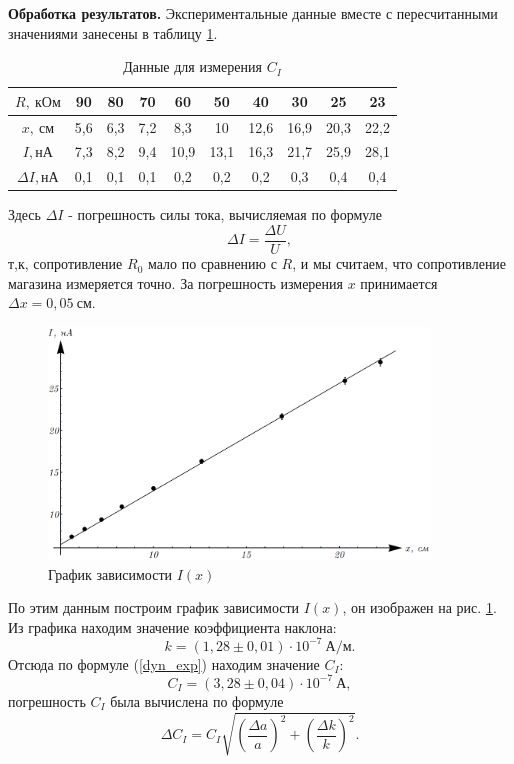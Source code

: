 \documentclass[12pt,a4paper]{article}
\begin{document}
\textbf{Обработка результатов.} Экспериментальные данные вместе с пересчитанными значениями занесены в таблицу \ref{tab1}.
\begin{table}[h!]\centering
\begin{tabular}{|*{10}{c|}}
\hline
$R,~\text{кОм}$&90&80&70&60&50&40&30&25&23\\
\hline
$x,~\text{см}$&5,6&6,3&7,2&8,3&10&12,6&16,9&20,3&22,2\\
\hline
$I, \text{нА}$&7,3&8,2&9,4&10,9&13,1&16,3&21,7&25,9&28,1\\
\hline
$\Delta I, \text{нА}$&0,1&0,1&0,1&0,2&0,2&0,2&0,3&0,4&0,4\\
\hline
\end{tabular}
\caption{Данные для измерения $C_I$ \label{tab1}}
\end{table}

\noindent Здесь $\Delta I$ - погрешность силы тока, вычисляемая по формуле
\begin{equation}
\Delta I = \frac{\Delta U}{U},
\end{equation}
т,к, сопротивление $R_0$ мало по сравнению с $R$, и мы считаем, что сопротивление магазина измеряется точно. За погрешность измерения $x$ принимается $\Delta x = 0,05~\text{см}$.

\begin{figure}[h!]\centering
\includegraphics[width = 0.9\textwidth]{Plot1}
\captionsetup{justification = centering}
\caption{График зависимости $I(x)$ \label{Fig3}}
\end{figure}

По этим данным построим график зависимости $I(x)$, он изображен на рис. \ref{Fig3}. Из графика находим значение коэффициента наклона:
\begin{equation}
k = (1,28 \pm 0,01)\cdot10^{-7}~\text{А/м}.
\end{equation}
Отсюда по формуле (\ref{dyn_exp}) находим значение $C_I$:
\begin{equation}
C_I = (3,28 \pm 0,04)\cdot10^{-7}~\text{А},
\end{equation}
погрешность $C_I$ была вычислена по формуле
\begin{equation}
\Delta C_I = C_I\sqrt{\left(\frac{\Delta a}{a}\right)^2 + \left(\frac{\Delta k}{k}\right)^2}.
\end{equation}
\end{document}
